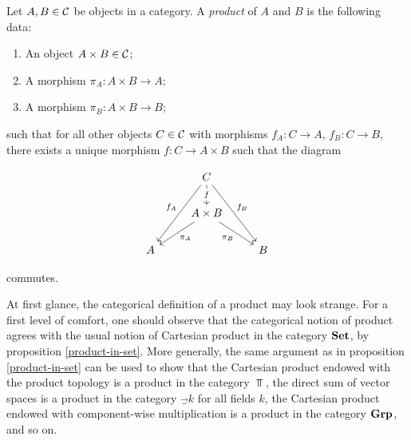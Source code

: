\begin{defn}[Product]\label{product-definition} Let $A,B\in {\mathcal C}$ be objects in a category. A {\em product} of $A$ and $B$ is the following data:

\begin{enumerate}
\item An object $A\times B\in {\mathcal C}$;
\item A morphism $\pi_A:A\times B\to A$;
\item A morphism $\pi_B:A\times B\to B$;
\end{enumerate}

such that for all other objects $C\in {\mathcal C}$ with morphisms $f_A:C\to A$, $f_B:C\to B$, there exists a unique morphism $f:C\to A\times B$ such that the diagram

\[\begin{tikzcd}
	& C \\
	& {A\times B} \\
	A && B
	\arrow["f"{description}, from=1-2, to=2-2]
	\arrow["{f_A}"', from=1-2, to=3-1]
	\arrow["{f_B}", from=1-2, to=3-3]
	\arrow["{\pi_A}", from=2-2, to=3-1]
	\arrow["{\pi_B}"', from=2-2, to=3-3]
\end{tikzcd}\]

commutes.


\end{defn}

\begin{rem}\label{product-examples-remark} At first glance, the categorical definition of a product may look strange. For a first level of comfort, one should observe that the categorical notion of product agrees with the usual notion of Cartesian product in the category ${\bf Set}$, by proposition \ref{product-in-set}. More generally, the same argument as in proposition \ref{product-in-set} can be used to show that the Cartesian product endowed with the product topology is a product in the category $\Top$, the direct sum of vector spaces is a product in the category $\Vec_k$ for all fields $k$,  the Cartesian product endowed with component-wise multiplication is a product in the category ${\bf Grp}$, and so on.
\end{rem}


